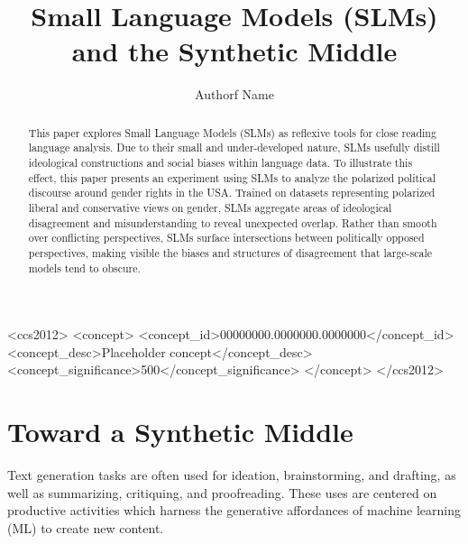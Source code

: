 \documentclass[anonymous,review]{acmart}
\begin{document}
\title{Small Language Models (SLMs) and the Synthetic Middle}

\author{Authorf Name}

\renewcommand{\shortauthors}{Author Name}

\begin{abstract}
This paper explores Small Language Models (SLMs) as reflexive tools for close reading language analysis. Due to their small and under-developed nature, SLMs usefully distill ideological constructions and social biases within language data. To illustrate this effect, this paper presents an experiment using SLMs to analyze the polarized political discourse around gender rights in the USA. Trained on datasets representing polarized liberal and conservative views on gender, SLMs aggregate areas of ideological disagreement and misunderstanding to reveal unexpected overlap. Rather than smooth over conflicting perspectives, SLMs surface intersections between politically opposed perspectives, making visible the biases and structures of disagreement that large-scale models tend to obscure.
\end{abstract}

\begin{CCSXML}
<ccs2012>
 <concept>
  <concept_id>00000000.0000000.0000000</concept_id>
  <concept_desc>Placeholder concept</concept_desc>
  <concept_significance>500</concept_significance>
 </concept>
</ccs2012>
\end{CCSXML}



\maketitle


\section{Toward a Synthetic Middle}

Text generation tasks are often used for ideation, brainstorming, and drafting, as well as summarizing, critiquing, and proofreading. These uses are centered on productive activities which harness the generative affordances of machine learning (ML) to create new content.
\end{document}
